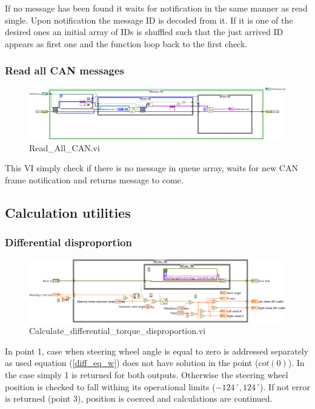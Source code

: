 If no message has been found it waits for notification in the same manner as read single. Upon notification the message ID is decoded from it. If it is one of the desired ones an initial array of IDs is shuffled such that the just arrived ID appears as first one and the function loop back to the first check. 

\subsubsection{Read all CAN messages}
\begin{figure}[H]
    \centering
    \includegraphics[scale=\visc,max width=\textwidth]{figures/Read_All_CANd}
    \caption{Read\_All\_CAN.vi}
    \label{vi:Read_All_CAN}
\end{figure}
This VI simply check if there is no message in queue array, waits for new CAN frame notification and returns message to come.

\subsection{Calculation utilities}
\subsubsection{Differential disproportion}
\begin{figure}[H]
    \centering
    \includegraphics[scale=\visc,max width=\textwidth]{figures/Calculate_differential_torque_disproportiond}
    \caption{Calculate\_differential\_torque\_disproportion.vi}
    \label{vi:Calculate_differential_torque_disproportion}
\end{figure}
In point 1, case when steering wheel angle is equal to zero is addressed separately as used equation (\ref{diff_eq_w}) does not have solution in the point ($cot(0)$). In the case simply 1 is returned for both outputs.
Otherwise the steering wheel position is checked to fall withing its operational limits ($-124\,^{\circ},124\,^{\circ}$). If not error is returned (point 3), position is coerced and calculations are continued.

